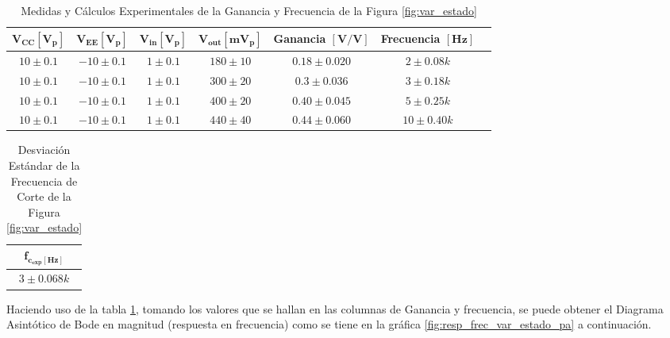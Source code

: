 \begin{itemize}
            
            \begin{table}[H]
              \centering
              \begin{tabular}{|c|c|c|c|c|c|c|}
                \hline
                $\mathbf{V_{CC} [V_p]}$ & $\mathbf{V_{EE} [V_p]}$ & $\mathbf{V_{in} [V_p]}$ & $\mathbf{V_{out} [mV_p]}$ & \textbf{Ganancia} $\mathbf{[V/V]}$ & \textbf{Frecuencia} $\mathbf{[Hz]}$ \\
                \hline
                $10 \pm 0.1$ & $-10 \pm 0.1$ & $1 \pm 0.1$ & $180 \pm 10$ & $0.18 \pm 0.020$ & $2 \pm 0.08 k$ \\
                \hline
                $10 \pm 0.1$ & $-10 \pm 0.1$ & $1 \pm 0.1$ & $300 \pm 20$ & $0.3 \pm 0.036$ & $3 \pm 0.18 k$ \\
                \hline
                $10 \pm 0.1$ & $-10 \pm 0.1$ & $1 \pm 0.1$ & $400 \pm 20 $ & $0.40 \pm 0.045$ & $5 \pm 0.25 k$ \\
                \hline
                $10 \pm 0.1$ & $-10 \pm 0.1$ & $1 \pm 0.1$ & $440 \pm 40$ & $0.44 \pm 0.060$ & $10 \pm 0.40 k$ \\
                \hline
              \end{tabular}
              \caption{Medidas y Cálculos Experimentales de la Ganancia y Frecuencia de la Figura \ref{fig:var_estado}}
              \label{tab:exp_var_estado_pa}
            \end{table}

            
            \begin{table}[H]
              \centering
              \begin{tabular}{|c|}
                \hline
                $\mathbf{f_{c_{exp} [Hz]}}$ \\
                \hline
                $3 \pm 0.068 k$  \\
                \hline
              \end{tabular}
              \caption{Desviación Estándar de la Frecuencia de Corte de la Figura \ref{fig:var_estado}}
              \label{tab:exp_var_estado_frecorte_pa}
            \end{table}

            Haciendo uso de la tabla \ref{tab:exp_var_estado_pa}, tomando los valores que se hallan en las columnas de Ganancia y frecuencia, se puede obtener el Diagrama  Asintótico de Bode en magnitud (respuesta en frecuencia) como se tiene en la gráfica \ref{fig:resp_frec_var_estado_pa} a continuación.


\end{itemize}
